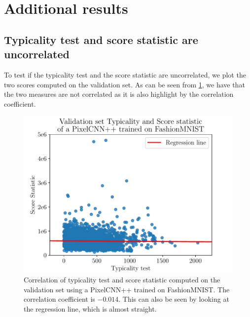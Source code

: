 {\section{Additional results}

\subsection{Typicality test and score statistic are uncorrelated}
\label{appendix_modelagnostic:correlation}
To test if the typicality test and the score statistic are uncorrelated, we plot the two scores computed on the validation set. As can be seen from \cref{fig_modelagnostic:corralation}, we have that the two measures are not correlated as it is also highlight by the correlation coefficient.

\begin{figure}[tb]
    \centering
    \includegraphics[scale=0.5]{graphics/paper_modelagnostic/correlation_correct_font.pdf}
    \caption[Correlation of typicality test and score statistic computed on the validation set using a PixelCNN++ trained on FashionMNIST.]{Correlation of typicality test and score statistic computed on the validation set using a PixelCNN++ trained on FashionMNIST. The correlation coefficient is $-0.014$. This can also be seen by looking at the regression line, which is almost straight. }
    \label{fig_modelagnostic:corralation}
\end{figure}


}
